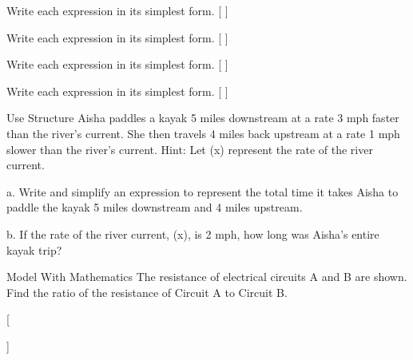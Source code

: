 \documentclass{article}
\newenvironment{practice}[2]{}{}
\newcommand{\answer}[1]{}
\newcommand{\placeholder}[2]{}
\begin{document}
\begin{practice}{27}{2}
Write each expression in its simplest form.
[
]
\answer{(\frac{1}{x-1})}
\end{practice}

\begin{practice}{28}{2}
Write each expression in its simplest form.
[
]
\answer{(\frac{3x+7y}{x-2y})}
\end{practice}

\begin{practice}{29}{2}
Write each expression in its simplest form.
[
]
\answer{(\frac{1}{a-b})}
\end{practice}

\begin{practice}{30}{2}
Write each expression in its simplest form.
[
]
\answer{(\frac{(z-4)(z-7)}{(z-5)(z+6)})}
\end{practice}

\begin{practice}{31}{3}
Use Structure Aisha paddles a kayak 5 miles downstream at a rate 3 mph faster than the river's current. She then travels 4 miles back upstream at a rate 1 mph slower than the river's current. Hint: Let (x) represent the rate of the river current.

\placeholder{illustration}{Kayak on river with arrows and labels "Kayak's downstream speed is x+3 mph" and "Water current's speed is x mph".}

a. Write and simplify an expression to represent the total time it takes Aisha to paddle the kayak 5 miles downstream and 4 miles upstream.

b. If the rate of the river current, (x), is 2 mph, how long was Aisha's entire kayak trip?

\answer{a. (\frac{9x+7}{(x+3)(x-1)}). b. 5 h.}
\end{practice}

\begin{practice}{32}{3}
Model With Mathematics The resistance of electrical circuits A and B are shown. Find the ratio of the resistance of Circuit A to Circuit B.

[
]
\answer{((x-5)(x+4):1) or (x^2-x-20:1)}
\end{practice}
\end{document}
